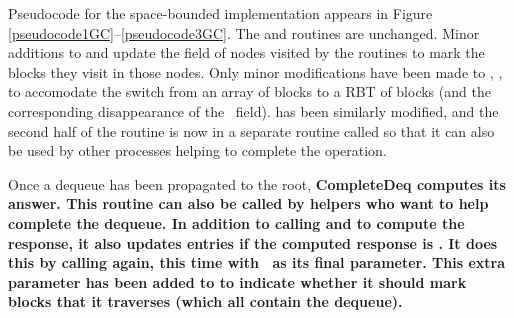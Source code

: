 
Pseudocode for the space-bounded implementation appears in Figure \ref{pseudocode1GC}--\ref{pseudocode3GC}.
The  and  routines are unchanged.
Minor additions to  and  update the  field of nodes
visited by the routines to mark the blocks they visit in those nodes.
Only minor modifications have been made to , , 
to accomodate the switch from an array of blocks to a RBT of blocks (and the corresponding disappearance
of the \head\ field).
 has been similarly modified, and the second half of the routine is now in a
separate routine called  so that it can also be used by other processes
helping to complete the operation.

Once a dequeue has been propagated to the root, 
\bf{\op CompleteDeq} computes its answer.  This routine can also be called by helpers 
who want to help complete the dequeue.
In addition to calling  and  to compute the response,
it also updates  entries if the computed response is \nl.
It does this by calling  again, this time with \tr\ as its final parameter.
This extra parameter has been added to 
 to indicate whether it should mark blocks that it traverses (which all contain the dequeue).




\renewcommand{\algorithmiccomment}[1]{\hfill\eqparbox{COMMENTDOUBLE}{\com\ #1}}

